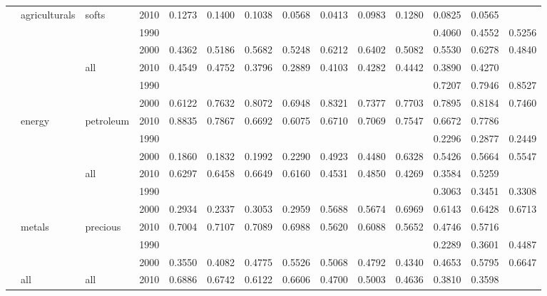 \documentclass[]{elsarticle} %
\begin{document}
\begin{landscape}
\begin{longtable}[t]{>{}llllrrrrrrrrrr}
\nopagebreak
 & \multirow[t]{-12}{*}{\raggedright\arraybackslash agriculturals} & \multirow[t]{-3}{*}{\raggedright\arraybackslash softs} & 2010 & 0.1273 & 0.1400 & 0.1038 & 0.0568 & 0.0413 & 0.0983 & 0.1280 & 0.0825 & 0.0565 & \\
\nopagebreak
 &  &  & 1990 &  &  &  &  &  &  &  & 0.4060 & 0.4552 & 0.5256\\
\nopagebreak
 &  &  & 2000 & 0.4362 & 0.5186 & 0.5682 & 0.5248 & 0.6212 & 0.6402 & 0.5082 & 0.5530 & 0.6278 & 0.4840\\
\nopagebreak
 &  & \multirow[t]{-3}{*}{\raggedright\arraybackslash all} & 2010 & 0.4549 & 0.4752 & 0.3796 & 0.2889 & 0.4103 & 0.4282 & 0.4442 & 0.3890 & 0.4270 & \\
\nopagebreak
 &  &  & 1990 &  &  &  &  &  &  &  & 0.7207 & 0.7946 & 0.8527\\
\nopagebreak
 &  &  & 2000 & 0.6122 & 0.7632 & 0.8072 & 0.6948 & 0.8321 & 0.7377 & 0.7703 & 0.7895 & 0.8184 & 0.7460\\
\nopagebreak
 & \multirow[t]{-6}{*}{\raggedright\arraybackslash energy} & \multirow[t]{-3}{*}{\raggedright\arraybackslash petroleum} & 2010 & 0.8835 & 0.7867 & 0.6692 & 0.6075 & 0.6710 & 0.7069 & 0.7547 & 0.6672 & 0.7786 & \\
\nopagebreak
 &  &  & 1990 &  &  &  &  &  &  &  & 0.2296 & 0.2877 & 0.2449\\
\nopagebreak
 &  &  & 2000 & 0.1860 & 0.1832 & 0.1992 & 0.2290 & 0.4923 & 0.4480 & 0.6328 & 0.5426 & 0.5664 & 0.5547\\
\nopagebreak
 &  & \multirow[t]{-3}{*}{\raggedright\arraybackslash all} & 2010 & 0.6297 & 0.6458 & 0.6649 & 0.6160 & 0.4531 & 0.4850 & 0.4269 & 0.3584 & 0.5259 & \\
\nopagebreak
 &  &  & 1990 &  &  &  &  &  &  &  & 0.3063 & 0.3451 & 0.3308\\
\nopagebreak
 &  &  & 2000 & 0.2934 & 0.2337 & 0.3053 & 0.2959 & 0.5688 & 0.5674 & 0.6969 & 0.6143 & 0.6428 & 0.6713\\
\nopagebreak
\multirow[t]{-27}{*}{\raggedright\arraybackslash \textbf{US}} & \multirow[t]{-6}{*}{\raggedright\arraybackslash metals} & \multirow[t]{-3}{*}{\raggedright\arraybackslash precious} & 2010 & 0.7004 & 0.7107 & 0.7089 & 0.6988 & 0.5620 & 0.6088 & 0.5652 & 0.4746 & 0.5716 & \\
\cmidrule{1-14}\pagebreak[0]
 &  &  & 1990 &  &  &  &  &  &  &  & 0.2289 & 0.3601 & 0.4487\\
\nopagebreak
 &  &  & 2000 & 0.3550 & 0.4082 & 0.4775 & 0.5526 & 0.5068 & 0.4792 & 0.4340 & 0.4653 & 0.5795 & 0.6647\\
\nopagebreak
\multirow[t]{-3}{*}{\raggedright\arraybackslash \textbf{GB}} & \multirow[t]{-3}{*}{\raggedright\arraybackslash all} & \multirow[t]{-3}{*}{\raggedright\arraybackslash all} & 2010 & 0.6886 & 0.6742 & 0.6122 & 0.6606 & 0.4700 & 0.5003 & 0.4636 & 0.3810 & 0.3598 & \\*
\end{longtable}
\endgroup{}
\end{landscape}
\end{document}
